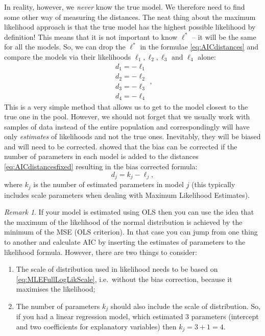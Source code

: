 \documentclass[
]{book}
\providecommand{\tightlist}{%
  \setlength{\itemsep}{0pt}\setlength{\parskip}{0pt}}
\theoremstyle{definition}
\theoremstyle{definition}
\theoremstyle{definition}
\theoremstyle{definition}
\theoremstyle{remark}
\newtheorem*{remark}{Remark}
\begin{document}
In reality, however, we \emph{never} know the true model. We therefore need to find some other way of measuring the distances. The neat thing about the maximum likelihood approach is that the true model has the highest possible likelihood by definition! This means that it is not important to know \(\ell^*\) -- it will be the same for all the models. So, we can drop the \(\ell^*\) in the formulae \eqref{eq:AICdistances} and compare the models via their likelihoods \(\ell_1, \ell_2, \ell_3 \text{ and } \ell_4\) alone:
\begin{equation}
    \begin{split}
        d_1 = - \ell_1 \\
        d_2 = - \ell_2 \\
        d_3 = - \ell_3 \\
        d_4 = - \ell_4
    \end{split} ,
    \label{eq:AICdistancesfixed}
\end{equation}
This is a very simple method that allows us to get to the model closest to the true one in the pool. However, we should not forget that we usually work with samples of data instead of the entire population and correspondingly will have only \emph{estimates} of likelihoods and not the true ones. Inevitably, they will be biased and will need to be corrected. \citet{Akaike1974} showed that the bias can be corrected if the number of parameters in each model is added to the distances \eqref{eq:AICdistancesfixed} resulting in the bias corrected formula:
\begin{equation}
    d_j = k_j - \ell_j
    \label{eq:AICNormal},
\end{equation}
where \(k_j\) is the number of estimated parameters in model \(j\) (this typically includes scale parameters when dealing with Maximum Likelihood Estimates).

\begin{remark}

If your model is estimated using OLS then you can use the idea that the maximum of the likelihood of the normal distribution is achieved by the minimum of the MSE (OLS criterion). In that case you can jump from one thing to another and calculate AIC by inserting the estimates of parameters to the likelihood formula. However, there are two things to consider:

\begin{enumerate}
\def\labelenumi{\arabic{enumi}.}
\tightlist
\item
  The scale of distribution used in likelihood needs to be based on \eqref{eq:MLEFullLogLikScale}, i.e.~without the bias correction, because it maximises the likelihood;
\item
  The number of parameters \(k_j\) should also include the scale of distribution. So, if you had a linear regression model, which estimated 3 parameters (intercept and two coefficients for explanatory variables) then \(k_j=3+1 = 4\).
\end{enumerate}

\end{remark}
\end{document}
